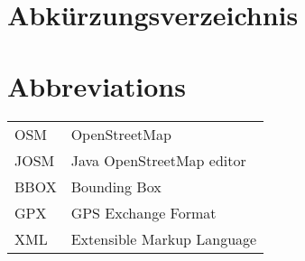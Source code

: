 \ifmmtlanguagegerman
\section*{Abkürzungsverzeichnis}
\else
\section*{Abbreviations}
\fi

\begin{table}[h]		
	\begin{tabular}{ll}
		OSM & OpenStreetMap \\
		JOSM & Java OpenStreetMap editor \\
		BBOX & Bounding Box \\
		GPX & GPS Exchange Format \\
		XML & Extensible Markup Language \\
	\end{tabular}
\end{table}
